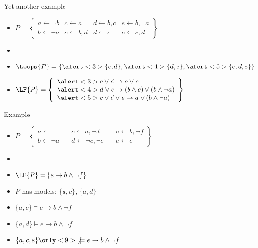 \begin{frame}{Yet another example}
  \bigskip
  \begin{itemize}
  \item<1->
    \(
    P
    =
    \left\{
      \begin{array}{llll}
        a\leftarrow \neg b
      & c\leftarrow a
      & d\leftarrow b,c
      & e\leftarrow b,\neg a
      \\
        b\leftarrow \neg a
      & c\leftarrow b,d
      & d\leftarrow e
      & e\leftarrow c,d
      \end{array}
    \right\}
    \)
    \bigskip
  \item<1-> []
    \begin{center}
      
    \end{center}
  \item<1-> $\Loops{P}=\{\alert<3>{\{c,d\}},\alert<4>{\{d,e\}},\alert<5>{\{c,d,e\}}\}$
    \smallskip
  \item<2->
    \(
    \LF{P}
    =
    \left\{
      \begin{array}[c]{l}
        \alert<3>{c\vee d\rightarrow a\vee e}\\
        \alert<4>{d\vee e\rightarrow (b\wedge c)\vee (b\wedge\neg a)}\\
        \alert<5>{c\vee d\vee e\rightarrow a \vee (b\wedge\neg a)}
      \end{array}
    \right\}
    \)
  \end{itemize}
\end{frame}
\begin{frame}{Example}
  \bigskip
  \begin{itemize}
  \item<1->
    \(
    P
    =
    \left\{
      \begin{array}{lll}
        a \leftarrow                 \quad &
        c \leftarrow a, \neg d       \quad &
        e \leftarrow b, \neg f
        \\
        b \leftarrow \neg a         \quad &
        d \leftarrow \neg c, \neg e \quad &
        e \leftarrow e
      \end{array}
    \right\}
    \)
    \bigskip
  \item<1-> []
    \begin{center}
      
    \end{center}
  \item<1-> $\LF{P}=\{e\rightarrow b\wedge\neg f\}$
  \item<2-> $P$ has  models:
    \alert<4-5>{$\{a,c\}$}, \alert<6-7>{$\{a,d\}$}
    \smallskip
  \item<only@4-5> $\{a,c\}                \models e\rightarrow b\wedge\neg f$ \ 
  \item<only@6-7> $\{a,d\}                \models e\rightarrow b\wedge\neg f$ \ 
  \item<only@8->  $\{a,c,e\}\only<9>{\not}\models e\rightarrow b\wedge\neg f$ \ 
  \end{itemize}
\end{frame}
